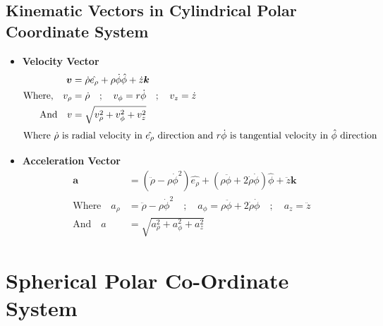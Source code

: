 	\subsection{Kinematic Vectors in  Cylindrical Polar Coordinate System}
	\begin{itemize}
		\item \textbf{Velocity Vector}
		\begin{align*}
		\boldsymbol{v}&=\dot{\rho} \hat{e_{\rho}}+{\rho} \dot{\phi} \hat{\phi}+\dot{z} \boldsymbol{k}\\
		\text{Where,}\quad  v_{\rho}&=\dot{\rho}\quad;\quad v_{\phi}=r \dot{\phi}\quad;\quad v_{z}=\dot{z}\\ \text{And} \quad
		v&=\sqrt{v_{\rho}^{2}+v_{\phi}^{2}+v_{z}^{2}} \\\intertext{Where $ \dot{\rho}$  is radial velocity in $ \hat{e_{\rho}} $ direction and $ r \dot{\phi}$  is tangential velocity in $ \hat{\phi} $ direction}
		\end{align*}
		
		\item \textbf{Acceleration Vector}
		\begin{align*}
		\boldsymbol{a}&=\left(\ddot{\rho}-\rho \dot{\phi}^{2}\right) \hat{e_{\rho}}+(\rho \ddot{\phi}+2 \dot{\rho} \dot{\phi}) \hat{\phi}+\ddot{z} \boldsymbol{k}\\
		\text{Where}  \quad a_{\rho}&=\ddot{\rho}-\rho \dot{\phi}^{2}\quad;\quad a_{\phi}=\rho \ddot{\phi}+2 \dot{\rho} \dot{\phi}\quad;\quad a_{z}=\ddot{z}\\ \text{And}\quad a&=\sqrt{a_{\rho}^{2}+a_{\phi}^{2}+a_{z}^{2}}
		\end{align*}
		
		
		\end {itemize}
		
		\section{Spherical Polar Co-Ordinate System}
		
